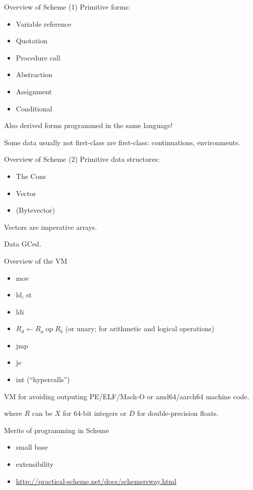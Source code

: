 \documentclass{beamer}
\begin{document}
\begin{frame}{Overview of Scheme (1)}
  Primitive forms:
  \begin{itemize}
  \item Variable reference
  \item Quotation
  \item Procedure call
  \item Abstraction
  \item Assignment
  \item Conditional
  \end{itemize}

  Also derived forms programmed in the same language!

  Some data usually not first-class are first-class: continuations, environments. 
\end{frame}

\begin{frame}{Overview of Scheme (2)}
  Primitive data structures:
  \begin{itemize}
  \item The Cons
  \item Vector
  \item (Bytevector)
  \end{itemize}

  Vectors are imperative arrays.

  Data GCed.
\end{frame}

\begin{frame}{Overview of the VM}
  \begin{itemize}
  \item mov
  \item ld, st
  \item ldi
  \item $R_d\gets R_a\operatorname{op}R_b$ (or unary; for arithmetic and logical operations)
  \item jmp
  \item je
  \item int (``hypercalls'')
  \end{itemize}

  VM for avoiding outputing PE/ELF/Mach-O or amd64/aarch64 machine code.

  where $R$ can be $X$ for 64-bit integers or $D$ for double-precision floats.
\end{frame}

\begin{frame}{Merits of programming in Scheme}
  \begin{itemize}
  \item small base
  \item extensibility
  \item \url{http://practical-scheme.net/docs/schemersway.html}
  \end{itemize}
\end{frame}
\end{document}
